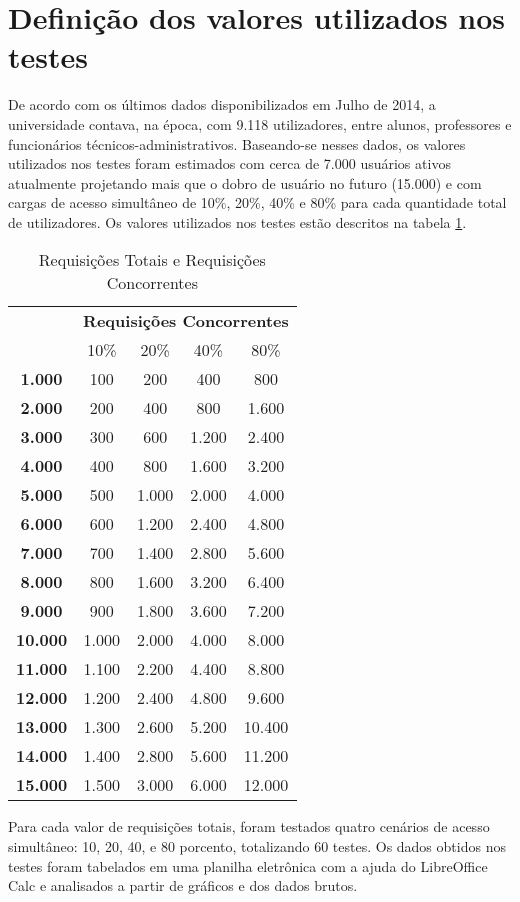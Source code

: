 \section{Definição dos valores utilizados nos testes}
De acordo com os últimos dados disponibilizados em Julho de 2014, a 
universidade contava, na época, com 9.118 utilizadores, entre alunos, 
professores e funcionários técnicos-administrativos. Baseando-se nesses dados, 
os valores utilizados nos testes foram estimados com cerca de 7.000 usuários 
ativos atualmente projetando mais que o dobro de usuário no futuro (15.000) e 
com cargas de acesso simultâneo de 10\%, 20\%, 40\% e 80\% para cada quantidade 
total de utilizadores. Os valores utilizados nos testes estão descritos na 
tabela \ref{tab:requisicoes}.
\begin{table}[htb]
	\centering
\ABNTEXfontereduzida
\caption[Requisições Totais e Requisições Concorrentes]{Requisições Totais e Requisições Concorrentes}
\label{tab:requisicoes}
\begin{tabular}{|>{\bfseries}c|c|c|c|c|}
\hline
\multirow{2}{*}{Requisições Totais} & \multicolumn{4}{c|}{\textbf{Requisições 
Concorrentes}} \\ \cline{2-5}
& 10\%      & 20\%  & 40\%  & 80\%  \\ \hline
1.000  & 100   & 200   & 400   & 800   \\ \hline
2.000  & 200   & 400   & 800   & 1.600  \\ \hline
3.000  & 300   & 600   & 1.200 & 2.400  \\ \hline
4.000  & 400   & 800   & 1.600 & 3.200  \\ \hline
5.000  & 500   & 1.000 & 2.000 & 4.000  \\ \hline
6.000  & 600   & 1.200 & 2.400 & 4.800  \\ \hline
7.000  & 700   & 1.400 & 2.800 & 5.600  \\ \hline
8.000  & 800   & 1.600 & 3.200 & 6.400  \\ \hline
9.000  & 900   & 1.800 & 3.600 & 7.200  \\ \hline
10.000 & 1.000 & 2.000 & 4.000 & 8.000  \\ \hline
11.000 & 1.100 & 2.200 & 4.400 & 8.800  \\ \hline
12.000 & 1.200 & 2.400 & 4.800 & 9.600  \\ \hline
13.000 & 1.300 & 2.600 & 5.200 & 10.400 \\ \hline
14.000 & 1.400 & 2.800 & 5.600 & 11.200 \\ \hline
15.000 & 1.500 & 3.000 & 6.000 & 12.000 \\ \hline
\end{tabular}
\end{table}
Para cada valor de requisições totais, foram testados quatro cenários de acesso 
simultâneo: 10, 20, 40, e 80 porcento, totalizando 60 testes. Os dados obtidos 
nos testes foram tabelados em uma planilha eletrônica com a ajuda do 
LibreOffice Calc e analisados a partir de gráficos e dos dados brutos.

